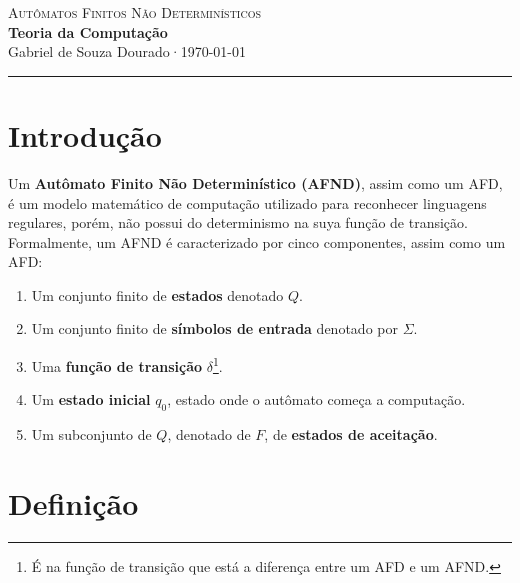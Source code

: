 \documentclass[12pt, a4paper]{article}
\theoremstyle{definition}
\theoremstyle{plain}
\theoremstyle{remark}
\newcommand{\docauthor}{Gabriel de Souza Dourado}
\newcommand{\doctitle}{Teoria da Computação}
\newcommand{\docsubtitle}{Autômatos Finitos Não Determinísticos}
\newcommand{\docdate}{\today}
\begin{document}
\begin{center}
  {\large \textcolor{mainblue}{\textsc{\docsubtitle}}}\\[0.4em]
  {\LARGE \textbf{\doctitle}}\\[0.6em]
  {\small \docauthor \quad·\quad \docdate}
  \vspace{0.4em}
  \hrule
\end{center}

\vspace{1em}


\section{Introdução}

Um \textbf{Autômato Finito Não Determinístico (AFND)}, assim como um AFD, é um modelo matemático de computação utilizado para reconhecer linguagens regulares, porém, não possui do determinismo na suya função de transição. Formalmente, um AFND é caracterizado por cinco componentes, assim como um AFD:

\begin{enumerate}
    \item Um conjunto finito de \textbf{estados} denotado $Q$.
    \item Um conjunto finito de \textbf{símbolos de entrada} denotado por $\Sigma$.
    \item Uma \textbf{função de transição} $\delta$\footnote{É na função de transição que está a diferença entre um AFD e um AFND.}.
    \item Um \textbf{estado inicial} $q_0$, estado onde o autômato começa a computação.
    \item Um subconjunto de $Q$, denotado de $F$, de \textbf{estados de aceitação}.
\end{enumerate}

\section{Definição}
\end{document}
